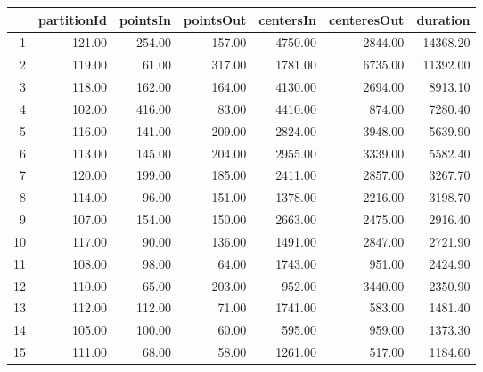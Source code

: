 \begin{table}[ht]
\centering
\begin{tabular}{rrrrrrr}
  \hline
 & partitionId & pointsIn & pointsOut & centersIn & centeresOut & duration \\ 
  \hline
1 & 121.00 & 254.00 & 157.00 & 4750.00 & 2844.00 & 14368.20 \\ 
  2 & 119.00 & 61.00 & 317.00 & 1781.00 & 6735.00 & 11392.00 \\ 
  3 & 118.00 & 162.00 & 164.00 & 4130.00 & 2694.00 & 8913.10 \\ 
  4 & 102.00 & 416.00 & 83.00 & 4410.00 & 874.00 & 7280.40 \\ 
  5 & 116.00 & 141.00 & 209.00 & 2824.00 & 3948.00 & 5639.90 \\ 
  6 & 113.00 & 145.00 & 204.00 & 2955.00 & 3339.00 & 5582.40 \\ 
  7 & 120.00 & 199.00 & 185.00 & 2411.00 & 2857.00 & 3267.70 \\ 
  8 & 114.00 & 96.00 & 151.00 & 1378.00 & 2216.00 & 3198.70 \\ 
  9 & 107.00 & 154.00 & 150.00 & 2663.00 & 2475.00 & 2916.40 \\ 
  10 & 117.00 & 90.00 & 136.00 & 1491.00 & 2847.00 & 2721.90 \\ 
  11 & 108.00 & 98.00 & 64.00 & 1743.00 & 951.00 & 2424.90 \\ 
  12 & 110.00 & 65.00 & 203.00 & 952.00 & 3440.00 & 2350.90 \\ 
  13 & 112.00 & 112.00 & 71.00 & 1741.00 & 583.00 & 1481.40 \\ 
  14 & 105.00 & 100.00 & 60.00 & 595.00 & 959.00 & 1373.30 \\ 
  15 & 111.00 & 68.00 & 58.00 & 1261.00 & 517.00 & 1184.60 \\ 
   \hline
\end{tabular}
\end{table}

